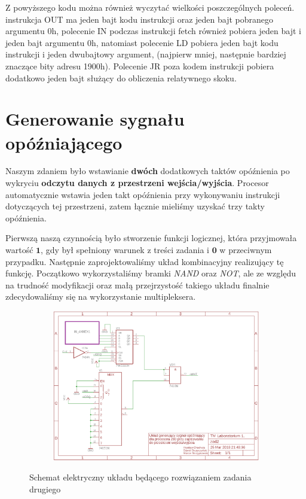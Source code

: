 \documentclass[fleqn]{article}
\begin{document}
Z powyższego kodu można również wyczytać wielkości poszczególnych poleceń. instrukcja OUT ma jeden bajt kodu instrukcji oraz jeden bajt pobranego argumentu 0h, polecenie IN podczas instrukcji fetch również pobiera jeden bajt i jeden bajt argumentu 0h, natomiast polecenie LD pobiera jeden bajt kodu instrukcji i jeden dwubajtowy argument, (najpierw mniej, następnie bardziej znaczące bity adresu 1900h). Polecenie JR poza kodem instrukcji pobiera dodatkowo jeden bajt służący do obliczenia relatywnego skoku.

\section{Generowanie sygnału opóźniającego}

Naszym zdaniem było wstawianie \textbf{dwóch} dodatkowych taktów opóźnienia po wykryciu \textbf{odczytu danych z przestrzeni wejścia/wyjścia}. Procesor automatycznie wstawia jeden takt opóźnienia przy wykonywaniu instrukcji dotyczących tej przestrzeni, zatem łącznie mieliśmy uzyskać trzy takty opóźnienia.

Pierwszą naszą czynnością było stworzenie funkcji logicznej, która przyjmowała wartość $\textbf{1}$, gdy był spełniony warunek z treści zadania i $\textbf{0}$ w przeciwnym przypadku. Następnie zaprojektowaliśmy układ kombinacyjny realizujący tę funkcję. Początkowo wykorzystaliśmy bramki \textit{NAND} oraz \textit{NOT}, ale ze względu na trudność modyfikacji oraz małą przejrzystość takiego układu finalnie zdecydowaliśmy się na wykorzystanie multipleksera.

\begin{figure}[H]
	\centering
	\begin{subfigure}[b]{0.8\textwidth}
		\includegraphics[width=\textwidth]{img/z2.png}
	\end{subfigure}
	\caption{Schemat elektryczny układu będącego rozwiązaniem zadania drugiego}
	\label{fig:z2}
\end{figure}
\end{document}
